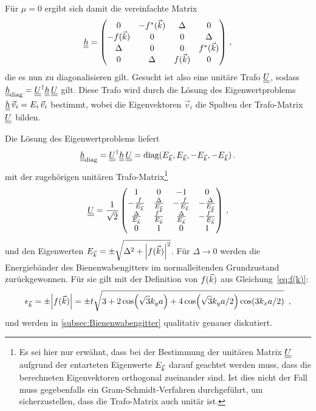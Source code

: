 Für $\mu = 0 $ ergibt sich damit die vereinfachte Matrix
\begin{align}
    \underline{\underline{h}} = \begin{pmatrix} 0 & -f^*({\vec{k}}) & \Delta & 0 \\ -f({\vec{k}}) & 0 & 0 & \Delta \\ \Delta & 0 & 0 & f^*({\vec{k}}) \\ 0 & \Delta & f({\vec{k}}) & 0 \end{pmatrix} \, ,
\end{align}
die es nun zu diagonalisieren gilt. 
Gesucht ist also eine unitäre Trafo $\underline{\underline{U}}$, sodass $\underline{\underline{h}}_\text{diag} = \underline{\underline{U}}^\dagger \underline{\underline{h}} \, \underline{\underline{U}}$ gilt. 
Diese Trafo wird durch die Lösung des Eigenwertproblems $\underline{\underline{h}} \, \vec{v}_i = E_i \, \vec{v}_i$ bestimmt, wobei die Eigenvektoren $\vec{v}_i$ die Spalten der Trafo-Matrix $\underline{\underline{U}}$ bilden.

Die Lösung des Eigenwertproblems liefert 
\begin{align}
    \underline{\underline{h}}_\text{diag} = \underline{\underline{U}}^\dagger \underline{\underline{h}} \, \underline{\underline{U}} = \text{diag}(E_{\vec{k}}, E_{\vec{k}}, - E_{\vec{k}}, - E_{\vec{k}})\, .
\end{align}
mit der zugehörigen unitären Trafo-Matrix\footnote{Es sei hier nur erwähnt, dass bei der Bestimmung der unitären Matrix $\underline{\underline{U}}$ aufgrund der entarteten Eigenwerte $E_{\vec{k}}$ darauf geachtet werden muss, dass die berechneten Eigenvektoren orthogonal zueinander sind. Ist dies nicht der Fall muss gegebenfalls ein Gram-Schmidt-Verfahren durchgeführt, um sicherzustellen, dass die Trafo-Matrix auch unitär ist.}
\begin{align}
    \underline{\underline{U}} = \frac{1}{\sqrt{2}}\begin{pmatrix} 
        1 & 0 & -1 & 0 \\ 
        -\frac{f}{E_{\vec{k}}} & \frac{\Delta}{E_{\vec{k}}} & - \frac{f}{E_{\vec{k}}} & - \frac{\Delta}{E_{\vec{k}}} \\
        \frac{\Delta}{E_{\vec{k}}} & \frac{f^{*}}{E_{\vec{k}}}  & \frac{\Delta}{E_{\vec{k}}} & - \frac{f^{*}}{E_{\vec{k}}} \\
        0 & 1 & 0 & 1 \end{pmatrix} \, ,
\end{align}
und den Eigenwerten $E_{\vec{k}} = \pm \sqrt{\Delta^2 + \abs{f({\vec{k}})}^2}$.
Für $\Delta \rightarrow 0$ werden die Energiebänder des Bienenwabengitters im normalleitenden Grundzustand zurückgewonnen.
Für sie gilt mit der Definition von $f({\vec{k}})$ aus Gleichung~\eqref{eq:f(k)}:
\begin{align}
    \epsilon_{{\vec{k}}} = \pm \abs{f({\vec{k}})} = \pm t \sqrt{3 + 2 \cos(\sqrt{3} k_y a) + 4 \cos(\sqrt{3} k_y a/2) \cos(3 k_x a/2)}~\label{eq:dispersion} \, ,
\end{align}
und werden in \autoref{subsec:Bienenwabengitter} qualitativ genauer diskutiert.

